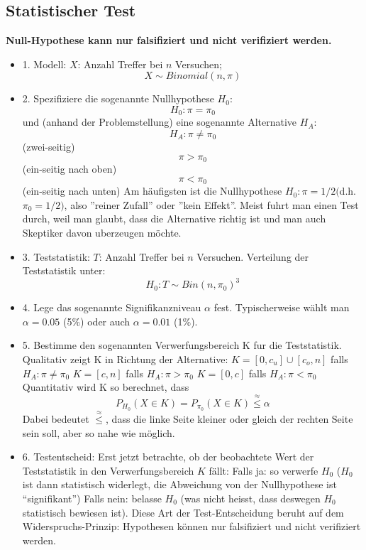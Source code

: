 \documentclass{article}
\begin{document}
\begin{multicols*}{3}
    \subsection{Statistischer Test}
    \textbf{Null-Hypothese kann nur falsifiziert und nicht verifiziert werden.}
    \begin{itemize}
      \item 1. Modell: $X$: Anzahl Treffer bei $n$ Versuchen;
            $$X \sim Binomial(n, \pi)$$
      \item 2. Spezifiziere die sogenannte Nullhypothese $H_0$:
            $$H_0 : \pi = \pi _0$$
            und (anhand der Problemstellung) eine sogenannte Alternative $H_A$:
            $$H_A : \pi \neq \pi _0$$ (zwei-seitig)
            $$\pi > \pi _0$$ (ein-seitig nach oben)
            $$\pi < \pi _0$$ (ein-seitig nach unten)
            \bigbreak
            Am häufigsten ist die Nullhypothese $H_0 : \pi = 1/2 ($d.h. $ \pi _0 = 1/2)$, also
            ”reiner Zufall” oder ”kein Effekt”. Meist fuhrt man einen Test durch, weil
            man glaubt, dass die Alternative richtig ist und man auch Skeptiker davon
            uberzeugen möchte.
      \item 3. Teststatistik: $T$: Anzahl Treffer bei $n$ Versuchen.
            Verteilung der Teststatistik unter: $$H_0: T \sim Bin(n, \pi _0)^3$$
      \item 4. Lege das sogenannte Signifikanzniveau $\alpha$ fest. Typischerweise wählt
            man $\alpha = 0.05$ (5$\%$) oder auch $\alpha = 0.01$ (1$\%$).
      \item 5. Bestimme den sogenannten Verwerfungsbereich K fur die Teststatistik. Qualitativ zeigt K in Richtung der Alternative:
                \bigbreak
                $K = [0, c_u] \cup [c_o, n]$ falls $H_A : \pi \neq π _0$\bigbreak
                $K = [c, n]$ falls $H_A : \pi > \pi _0$\bigbreak
                ${K = [0, c]}$ falls $H_A : \pi < \pi _0$\bigbreak
                Quantitativ wird K so berechnet, dass $$P_{H_0}(X \in K) = P_\pi _0 (X \in K) \overset{\approx }{\leq } \alpha$$
                Dabei bedeutet $\overset{\approx }{\leq }$, dass die linke Seite kleiner oder gleich der rechten Seite
                sein soll, aber so nahe wie möglich.
      \item 6. Testentscheid: Erst jetzt betrachte, ob der beobachtete Wert der Teststatistik
                in den Verwerfungsbereich $K$ fällt:
                Falls ja: so verwerfe $H_0$ ($H_0$ ist dann statistisch widerlegt, die Abweichung
                von der Nullhypothese ist “signifikant”)
                Falls nein: belasse $H_0$ (was nicht heisst, dass deswegen $H_0$ statistisch bewiesen
                ist).
                Diese Art der Test-Entscheidung beruht auf dem Widerspruchs-Prinzip:
                Hypothesen können nur falsifiziert und nicht verifiziert werden.
    \end{itemize}


\end{multicols*}
\end{document}
